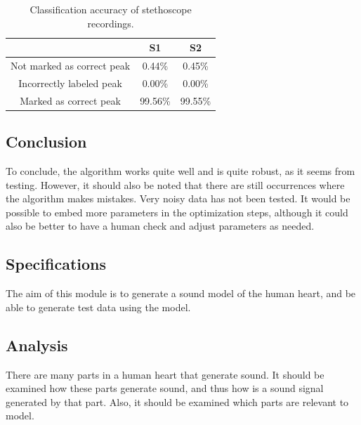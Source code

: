 \begin{table}[ht!]
\scriptsize
\centering
\captionsetup{justification=centering}
\begin{tabular}{|c|c|c|}
\hline
 & \textbf{S1} & \textbf{S2} \\
\hline
Not marked as correct peak & 0.44\% & 0.45\% \\
Incorrectly labeled peak & 0.00\% & 0.00\% \\
Marked as correct peak & 99.56\% & 99.55\% \\
\hline
\end{tabular}
\caption{Classification accuracy of stethoscope recordings.}
\label{tab:stethoscope_results}
\end{table}

\subsection{Conclusion}
To conclude, the algorithm works quite well and is quite robust, as it seems from testing. However, it should also be noted that there are still occurrences where the algorithm makes mistakes. Very noisy data has not been tested. It would be possible to embed more parameters in the optimization steps, although it could also be better to have a human check and adjust parameters as needed.

\subsection{Specifications}
The aim of this module is to generate a sound model of the human heart, and be able to generate test data using the model. 

\subsection{Analysis}
There are many parts in a human heart that generate sound. It should be examined how these parts generate sound, and thus how is a sound signal generated by that part. Also, it should be examined which parts are relevant to model.

